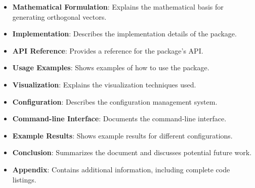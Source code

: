 \begin{itemize}
    \item \textbf{Mathematical Formulation}: Explains the mathematical basis for generating orthogonal vectors.
    
    \item \textbf{Implementation}: Describes the implementation details of the package.
    
    \item \textbf{API Reference}: Provides a reference for the package's API.
    
    \item \textbf{Usage Examples}: Shows examples of how to use the package.
    
    \item \textbf{Visualization}: Explains the visualization techniques used.
    
    \item \textbf{Configuration}: Describes the configuration management system.
    
    \item \textbf{Command-line Interface}: Documents the command-line interface.
    
    \item \textbf{Example Results}: Shows example results for different configurations.
    
    \item \textbf{Conclusion}: Summarizes the document and discusses potential future work.
    
    \item \textbf{Appendix}: Contains additional information, including complete code listings.
\end{itemize}
